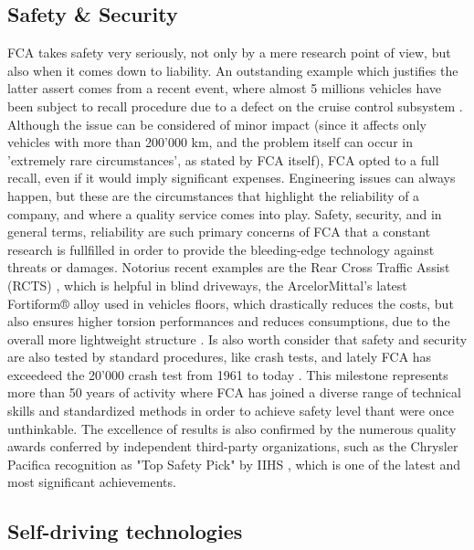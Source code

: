 \subsection{Safety \& Security}

FCA takes safety very seriously, not only by a mere research point of view, but also when it comes down to liability. An outstanding example which justifies the latter assert comes from a recent event, where almost 5 millions vehicles have been subject to recall procedure due to a defect on the cruise control subsystem \cite{fca_5million_recall}. Although the issue can be considered of minor impact (since it affects only vehicles with more than 200'000 km, and the problem itself can occur in 'extremely rare circumstances', as stated by FCA itself), FCA opted to a full recall, even if it would imply significant expenses. Engineering issues can always happen, but these are the circumstances that highlight the reliability of a company, and where a quality service comes into play.
Safety, security, and in general terms, reliability are such primary concerns of FCA that a constant research is fullfilled in order to provide the bleeding-edge technology against threats or damages. Notorius recent examples are the Rear Cross Traffic Assist (RCTS) \cite{fca_rear_cross_traffic_assist}, which is helpful in blind driveways, the ArcelorMittal's latest Fortiform® alloy used in vehicles floors, which drastically reduces the costs, but also ensures higher torsion performances and reduces consumptions, due to the overall more lightweight structure \cite{fca_fortiform}.
Is also worth consider that safety and security are also tested by standard procedures, like crash tests, and lately FCA has exceedeed the 20'000 crash test from 1961 to today \cite{fca_20thousand_crash_tests}. This milestone represents more than 50 years of activity where FCA has joined a diverse range of technical skills and standardized methods in order to achieve safety level thant were once unthinkable. The excellence of results is also confirmed by the numerous quality awards conferred by independent third-party organizations, such as the Chrysler Pacifica recognition as "Top Safety Pick" by IIHS \cite{fca_pacifica_iihs}, which is one of the latest and most significant achievements.


\subsection{Self-driving technologies}


